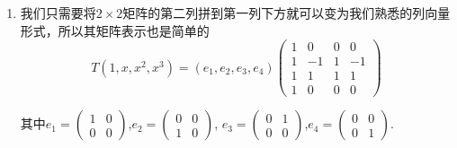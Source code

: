 \documentclass[UTF8,12pt,a4paper,fontset=fandol]{ctexart}
\begin{document}
\begin{solve}
\begin{enumerate}
                \item 我们只需要将$2 \times 2$矩阵的第二列拼到第一列下方就可以变为我们熟悉的列向量形式，所以其矩阵表示也是简单的
                      \[
                        T(1,x,x^2,x^3)=(e_1,e_2,e_3,e_4)\begin{pmatrix}
                            1 & 0 & 0 & 0 \\
                            1 & -1 & 1 & -1 \\
                            1 & 1 & 1 & 1 \\
                            1 & 0 & 0 & 0
                        \end{pmatrix}
                      \]

                      其中$e_1=\begin{pmatrix}1&0\\0&0\end{pmatrix}$,$e_2=\begin{pmatrix}0&0\\1&0\end{pmatrix}$,
                      $e_3=\begin{pmatrix}0&1\\0&0\end{pmatrix}$,$e_4=\begin{pmatrix}0&0\\0&1\end{pmatrix}$.
            \end{enumerate}
\end{solve}
\end{document}
